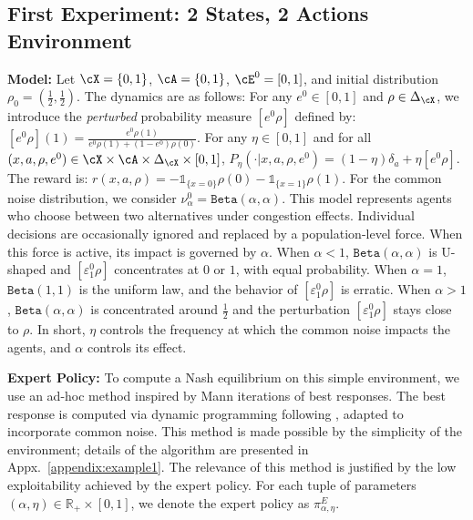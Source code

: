 \documentclass{article}
\theoremstyle{plain}
\begin{document}
\subsection{First Experiment: 2 States, 2 Actions Environment}
\label{subsection:example1}
\noindent\textbf{Model:} 
Let $\cX = \{0, 1\}$, $\cA = \{0 ,1\}$, $\cE^0 = [0, 1]$, and initial distribution $\rho_0 = (\frac{1}{2}, \frac{1}{2})$. The dynamics are as follows:
For any $e^0\in [0, 1]$ and $\rho \in \Delta_\cX$, we introduce the \emph{perturbed} probability measure $[e^0\rho]$ defined by:
$
    [e^0\rho](1) = \frac{e^0\rho(1)}{e^0\rho(1) + (1 - e^0)\rho(0)}.
$
For any $\eta \in [0, 1]$ and for all $(x,a, \rho, e^0) \in \cX \times \cA \times \Delta_\cX\times [0, 1]$,
$
        P_\eta(\cdot\vert x, a,\rho, e^0) = (1 - \eta)\delta_a + \eta [e^0\rho].
$
The reward is:
$
r(x,a, \rho) = -\mathds{1}_{\{x = 0\}}\rho(0)  -\mathds{1}_{\{x = 1\}}\rho(1).
$
For the common noise distribution, 
we consider $\nu^0_{\alpha} = \texttt{Beta}(\alpha, \alpha)$. 
%
This model represents agents who choose between two alternatives under congestion effects. Individual decisions are occasionally ignored and replaced by a population-level force. When this force is active, its impact is governed by $\alpha$. When $\alpha < 1$, $\texttt{Beta}(\alpha, \alpha)$ is U-shaped and $ [\varepsilon^0_1\rho]$ concentrates at $0$ or $1$, with equal probability. When $\alpha =1$, $\texttt{Beta}(1, 1)$ is the uniform law, and the behavior of  $ [\varepsilon_1^0\rho]$ is erratic.  When $\alpha > 1$, $\texttt{Beta}(\alpha, \alpha)$ is concentrated around $\frac{1}{2}$ and the perturbation $ [\varepsilon^0_1\rho]$ stays close to $\rho$. In short, $\eta$ controls the frequency at which the common noise impacts the agents, and $\alpha$ controls its effect.

\noindent\textbf{Expert Policy:} 
To compute a Nash equilibrium on this simple environment, we use an ad-hoc method inspired by Mann iterations 
of best responses. The best response is computed via dynamic programming following \citep{gu2024global}, adapted to incorporate common noise.  
This method is made possible by the simplicity of the environment; details of the algorithm are presented in Appx.~\ref{appendix:example1}. The relevance of this method is justified by the low exploitability achieved by the expert policy. For each tuple of parameters $(\alpha, \eta) \in \mathbb{R}_+ \times [0, 1]$, we denote the expert policy as $\pi^E_{\alpha, \eta}$.
\end{document}
